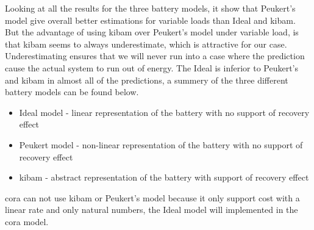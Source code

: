 Looking at all the results for the three battery models, it show that Peukert's model give overall better estimations for variable loads than Ideal and \gls{kibam}. 
But the advantage of using \gls{kibam} over Peukert's model under variable load, is that \gls{kibam} seems to always underestimate, which is attractive for our case.
Underestimating ensures that we will never run into a case where the prediction cause the actual system to run out of energy.
The Ideal is inferior to Peukert's and \gls{kibam} in almost all of the predictions, a summery of the three different battery models can be found below.
\begin{itemize}
	\item Ideal model - linear representation of the battery with no support of recovery effect
	\item Peukert model - non-linear representation of the battery with no support of recovery effect
	\item \gls{kibam} - abstract representation of the battery with support of recovery effect
\end{itemize}
\Gls{cora} can not use \gls{kibam} or Peukert's model because it only support cost with a linear rate and only natural numbers, the Ideal model will implemented in the \gls{cora} model.
